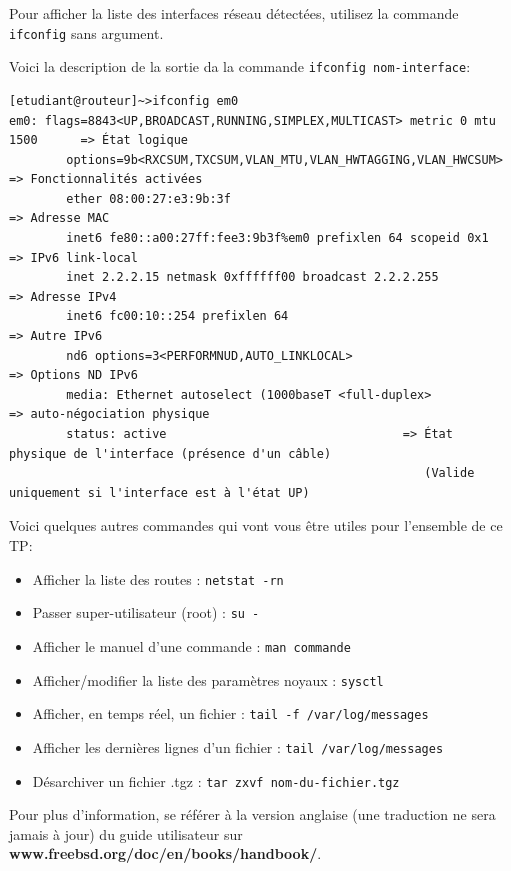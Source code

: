 \documentclass[a4paper,11pt]{article}
\newcommand{\shellcmd}[1]{\texttt{#1}}
\begin{document}
Pour afficher la liste des interfaces réseau détectées, utilisez la commande \shellcmd{ifconfig} sans argument.

Voici la description de la sortie da la commande \shellcmd{ifconfig nom-interface}:
\footnotesize
\begin{verbatim}
[etudiant@routeur]~>ifconfig em0
em0: flags=8843<UP,BROADCAST,RUNNING,SIMPLEX,MULTICAST> metric 0 mtu 1500      => État logique
        options=9b<RXCSUM,TXCSUM,VLAN_MTU,VLAN_HWTAGGING,VLAN_HWCSUM>          => Fonctionnalités activées
        ether 08:00:27:e3:9b:3f                                                => Adresse MAC
        inet6 fe80::a00:27ff:fee3:9b3f%em0 prefixlen 64 scopeid 0x1            => IPv6 link-local
        inet 2.2.2.15 netmask 0xffffff00 broadcast 2.2.2.255                 => Adresse IPv4
        inet6 fc00:10::254 prefixlen 64                                        => Autre IPv6
        nd6 options=3<PERFORMNUD,AUTO_LINKLOCAL>                               => Options ND IPv6
        media: Ethernet autoselect (1000baseT <full-duplex>                    => auto-négociation physique
        status: active                                 => État physique de l'interface (présence d'un câble)
                                                          (Valide uniquement si l'interface est à l'état UP)
\end{verbatim}
\normalsize
Voici quelques autres commandes qui vont vous être utiles pour l'ensemble de ce TP:
\begin{itemize}
\item Afficher la liste des routes : \shellcmd{netstat -rn}
\item Passer super-utilisateur (root) : \shellcmd{su -}
\item Afficher le manuel d'une commande : \shellcmd{man commande}
\item Afficher/modifier la liste des paramètres noyaux : \shellcmd{sysctl}
\item Afficher, en temps réel, un fichier : \shellcmd{tail -f /var/log/messages}
\item Afficher les dernières lignes d'un fichier : \shellcmd{tail /var/log/messages}
\item Désarchiver un fichier .tgz : \shellcmd{tar zxvf nom-du-fichier.tgz}
\end{itemize}
Pour plus d'information, se référer à la version anglaise (une traduction ne sera jamais à jour) du guide utilisateur sur \textbf{www.freebsd.org/doc/en/books/handbook/}.
\end{document}
